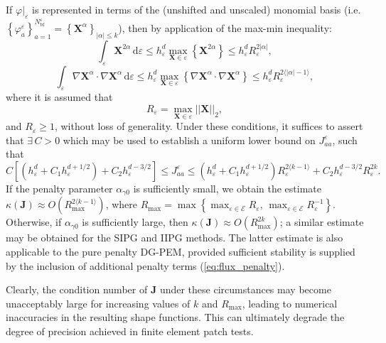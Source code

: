 If $\varphi|_{\varepsilon}$ is represented in terms of the (unshifted and unscaled) monomial basis (i.e. $\left\{ \varphi_a^\varepsilon \right\}_{a=1}^{N^\varepsilon_{\mathrm b\mathrm f}} = \left\{ \bm{X}^\alpha \right\}_{|\alpha| \leq k}$), then by application of the max-min inequality:
\begin{equation}
	\int_{\varepsilon} \bm{X}^{2\alpha} \, \mathrm d \varepsilon \leq h_{\varepsilon}^d \max_{\bm{X} \in \varepsilon} \left\{ \bm{X}^{2\alpha} \right\} \leq h_{\varepsilon}^d R_{\varepsilon}^{2|\alpha|},
\end{equation}
\begin{equation}
	\int_{\varepsilon} \nabla \bm{X}^{\alpha} \cdot \nabla \bm{X}^{\alpha} \, \mathrm d \varepsilon \leq h_{\varepsilon}^d \max_{\bm{X} \in \varepsilon} \left\{ \nabla \bm{X}^{\alpha} \cdot \nabla \bm{X}^{\alpha} \right\} \leq h_{\varepsilon}^d R_{\varepsilon}^{2\langle|\alpha|-1\rangle},
\end{equation}
where it is assumed that
\begin{equation}
	R_\varepsilon = \max_{\bm{X} \in \varepsilon} || \bm{X} ||_2,
\end{equation}
and $R_\varepsilon \geq 1$, without loss of generality. Under these conditions, it suffices to assert that $\exists \, C > 0$ which may be used to establish a uniform lower bound on $J^{\varepsilon}_{aa}$, such that
\begin{equation}
	C \left[ (h_\varepsilon^{d} + C_1 h_\varepsilon^{d+1/2}) + C_2 h_\varepsilon^{d-3/2} \right] \leq J^{\varepsilon}_{aa} \leq (h_\varepsilon^{d} + C_1 h_\varepsilon^{d+1/2}) R_{\varepsilon}^{2\langle k-1 \rangle} + C_2 h_\varepsilon^{d-3/2} R_{\varepsilon}^{2k}.
\end{equation}
If the penalty parameter $\alpha_{\gamma0}$ is sufficiently small, we obtain the estimate $\kappa (\bm{J}) \approx O(R_{\max}^{2\langle k-1 \rangle})$, where $R_{\max} = \max \left\{ \max_{\varepsilon \in \mathcal{E}} R_\varepsilon, \, \max_{\varepsilon \in \mathcal{E}} R_\varepsilon^{-1} \right\}$. Otherwise, if $\alpha_{\gamma0}$ is sufficiently large, then $\kappa (\bm{J}) \approx O(R_{\max}^{2k})$; a similar estimate may be obtained for the SIPG and IIPG methods. The latter estimate is also applicable to the pure penalty DG-PEM, provided sufficient stability is supplied by the inclusion of additional penalty terms (\ref{eq:flux_penalty}).

Clearly, the condition number of $\bm{J}$ under these circumstances may become unacceptably large for increasing values of $k$ and $R_{\max}$, leading to numerical inaccuracies in the resulting shape functions. This can ultimately degrade the degree of precision achieved in finite element patch tests.

